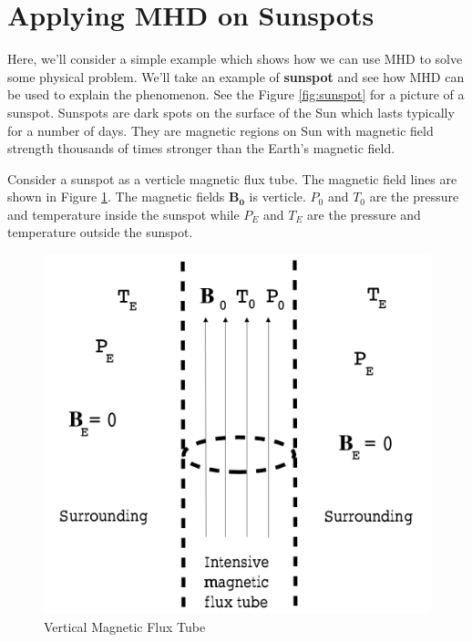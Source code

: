 \documentclass[12pt]{article}
\newenvironment{changemargin}[2]{%
\begin{list}{}{%
\setlength{\topsep}{0pt}%
\setlength{\leftmargin}{#1}%
\setlength{\rightmargin}{#2}%
\setlength{\listparindent}{\parindent}%
\setlength{\itemindent}{\parindent}%
\setlength{\parsep}{\parskip}%
}%
\item[]}{\end{list}}
\begin{document}
\begin{changemargin}{-2cm}{-2cm}
    \section{Applying MHD on Sunspots}
    Here, we'll consider a simple example which shows how we can use MHD to solve some physical problem. We'll take an example of \textbf{sunspot} and see how MHD can be used to explain the phenomenon. See the Figure \ref{fig:sunspot} for a picture of a sunspot. Sunspots are dark spots on the surface of the Sun which lasts typically for a number of days. They are magnetic regions on Sun with magnetic field strength thousands of times stronger than the Earth's magnetic field.

    Consider a sunspot as a verticle magnetic flux tube. The magnetic field lines are shown in Figure \ref{fig:flux-tube}. The magnetic fields $\mathbf{B_0}$ is verticle. $P_0$ and $T_0$ are the pressure and temperature inside the sunspot while $P_{E}$ and $T_{E}$ are the pressure and temperature outside the sunspot.\cite{article2}

    \begin{figure}[h]
        \includegraphics[width=1.0\textwidth, height=0.78\textwidth]{sunspot-tube.png}
        \caption{Vertical Magnetic Flux Tube}
        \label{fig:flux-tube}
    \end{figure}


\end{changemargin}
\end{document}
